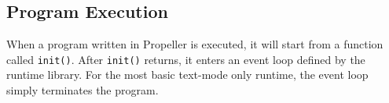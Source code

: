 \subsection{Program Execution}

When a program written in Propeller is executed, it will start from a function called \verb|init()|.
After \verb|init()| returns, it enters an event loop defined by the runtime library. For the
most basic text-mode only runtime, the event loop simply terminates the program.

